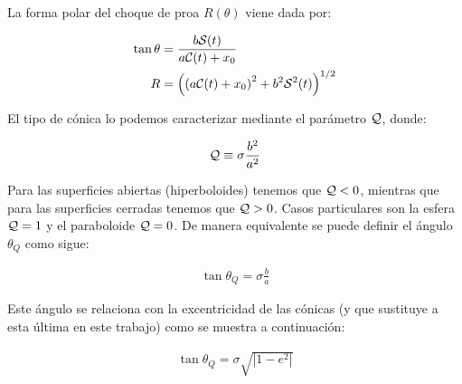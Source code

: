 La forma polar del choque de proa $R(\theta)$ viene dada por:

\begin{align}
  \tan\theta &= \frac{b\mathcal{S}(t)}{a\mathcal{C}(t) + x_0} \label{eq:t-th-conversion} \\
  R &= \left(\left(a\mathcal{C}(t) + x_0\right)^2 + b^2\mathcal{S}^2(t)\right)^{1/2} 
\end{align}

El tipo de cónica lo podemos caracterizar mediante el parámetro $\mathcal{Q}$, donde:

\begin{align}
  \mathcal{Q} \equiv \sigma\frac{b^2}{a^2}
\end{align}

Para las superficies abiertas (hiperboloides) tenemos que $\mathcal{Q} < 0$, mientras que para las superficies cerradas tenemos que $\mathcal{Q} > 0$. Casos particulares son la esfera $\mathcal{Q} =1$ y el paraboloide $\mathcal{Q} = 0$. De manera equivalente se puede definir el ángulo $\theta_Q$ como sigue:

\begin{align}
  \tan\theta_Q = \sigma \frac{b}{a} \label{eq:thc}
\end{align}

Este ángulo se relaciona con la excentricidad de las cónicas (y que sustituye a esta última en este trabajo) como se muestra a continuación:

\begin{align}
  \tan\theta_Q = \sigma\sqrt{\left|1-e^2\right|}
\end{align}


